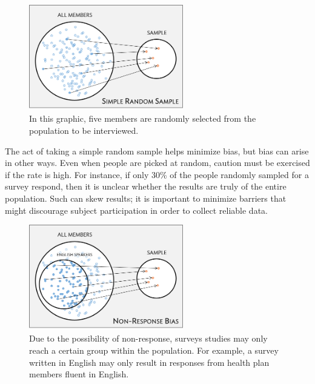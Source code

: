 
\begin{figure}[ht]
	\centering
	\includegraphics[width=0.60\textwidth]{ch_intro_to_data_oi_biostat/figures/sampleHealthPlan/sampleRandomHealthPlan.png}
	\caption{In this graphic, five members are randomly selected from the population to be interviewed.}
	\label{sampleRandomHealthPlan}
\end{figure}

The act of taking a simple random sample helps minimize bias, but bias can arise in other ways. Even when people are picked at random, caution must be exercised if the  rate  is high. For instance, if only 30\% of the people randomly sampled for a survey respond, then it is unclear whether the results are truly  of the entire population. Such   can skew results; it is important to minimize barriers that might discourage subject participation in order to collect reliable data.

\begin{figure}[h]
	\centering
	{\includegraphics[width=0.60\textwidth]{ch_intro_to_data_oi_biostat/figures/sampleHealthPlan/sampleNonResponseHealthPlan.png}
	\caption{Due to the possibility of non-response, surveys studies may only reach a certain group within the population. For example, a survey written in English may only result in responses from health plan members fluent in English.}}
	\label{sampleNonResponseHealthPlan}
\end{figure}


